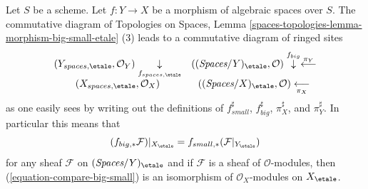 Let $S$ be a scheme.
Let $f : Y \to X$ be a morphism of algebraic spaces over $S$.
The commutative diagram of
Topologies on Spaces, Lemma
\ref{spaces-topologies-lemma-morphism-big-small-etale} (3)
leads to a commutative diagram of ringed sites
$$
\begin{array}{cc}(Y_{spaces, \etale}, \mathcal{O}_Y) \underset{f_{spaces, \etale}}{\downarrow} & ((\textit{Spaces}/Y)_\etale, \mathcal{O}) \overset{f_{big}}{\downarrow}\overset{\pi_Y}{\longleftarrow} \\ (X_{spaces, \etale}, \mathcal{O}_X) & ((\textit{Spaces}/X)_\etale, \mathcal{O}) \underset{\pi_X}{\longleftarrow}\end{array}
$$
as one easily sees by writing out the definitions of
$f_{small}^\sharp$, $f_{big}^\sharp$, $\pi_X^\sharp$, and $\pi_Y^\sharp$.
In particular this means that
\begin{equation}
\label{equation-compare-big-small}
(f_{big, *}\mathcal{F})|_{X_\etale} =
f_{small, *}(\mathcal{F}|_{Y_\etale})
\end{equation}
for any sheaf $\mathcal{F}$ on $(\textit{Spaces}/Y)_\etale$ and if
$\mathcal{F}$ is a sheaf of $\mathcal{O}$-modules, then
(\ref{equation-compare-big-small})
is an isomorphism of $\mathcal{O}_X$-modules on $X_\etale$.

